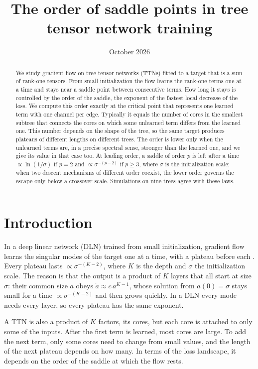 \documentclass[11pt]{article}
\title{The order of saddle points in tree tensor network training}
\author{}
\date{October 2026}
\theoremstyle{definition}
\begin{document}
\maketitle
\vspace{-2.5em}

\begin{abstract}
We study gradient flow on tree tensor networks (TTNs) fitted to a target that is a sum of rank-one
tensors. From small initialization the flow learns the rank-one terms one at a time and stays near a
saddle point between consecutive terms. How long it stays is controlled by the order of the saddle, the
exponent of the fastest local decrease of the loss. We compute this order exactly at the critical point that
represents one learned term with one channel per edge. Typically it equals the number of cores in the
smallest subtree that connects the cores on which some unlearned term differs from the learned one. This
number depends on the shape of the tree, so the same target produces plateaus of different lengths on
different trees. The order is lower only when the unlearned terms are, in a precise spectral sense, stronger
than the learned one, and we give its value in that case too. At leading order, a saddle of order $p$ is left
after a time $\propto\ln(1/\sigma)$ if $p=2$ and $\propto\sigma^{-(p-2)}$ if $p\ge3$, where $\sigma$ is the
initialization scale; when two descent mechanisms of different order coexist, the lower order governs the
escape only below a crossover scale. Simulations on nine trees agree with these laws.
\end{abstract}

\section{Introduction}

In a deep linear network (DLN) trained from small initialization, gradient flow learns the singular modes
of the target one at a time, with a plateau before each \citep{saxe2014exact,jacot2022saddletosaddle}. Every
plateau lasts $\propto\sigma^{-(K-2)}$, where $K$ is the depth and $\sigma$ the initialization scale. The reason is
that the output is a product of $K$ layers that all start at size $\sigma$: their common size $a$ obeys
$\dot a\approx c\,a^{K-1}$, whose solution from $a(0)=\sigma$ stays small for a time $\propto\sigma^{-(K-2)}$ and then
grows quickly. In a DLN every mode needs every layer, so every plateau has the same exponent.

A TTN is also a product of $K$ factors, its cores, but each core is attached to only some of the inputs. After
the first term is learned, most cores are large. To add the next term, only some cores need to change from
small values, and the length of the next plateau depends on how many. In terms of the loss landscape, it
depends on the order of the saddle at which the flow rests.
\end{document}
